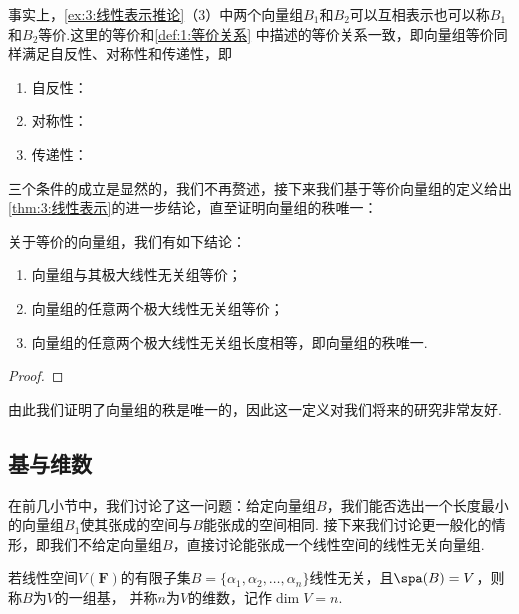 事实上，\autoref{ex:3:线性表示推论}（3）中两个向量组$B_1$和$B_2$可以互相表示也可以称$B_1$和$B_2$等价.这里的等价和\autoref{def:1:等价关系}
中描述的等价关系一致，即向量组等价同样满足自反性、对称性和传递性，即
\begin{enumerate}
    \item 自反性：
    \item 对称性：
    \item 传递性：
\end{enumerate}
三个条件的成立是显然的，我们不再赘述，接下来我们基于等价向量组的定义给出\autoref{thm:3:线性表示}的进一步结论，直至证明向量组的秩唯一：
\begin{corollary}
    关于等价的向量组，我们有如下结论：
    \begin{enumerate}
        \item 向量组与其极大线性无关组等价；
        \item 向量组的任意两个极大线性无关组等价；
        \item 向量组的任意两个极大线性无关组长度相等，即向量组的秩唯一.
    \end{enumerate}
\end{corollary}
\begin{proof}
    
\end{proof}

由此我们证明了向量组的秩是唯一的，因此这一定义对我们将来的研究非常友好.
\subsection{基与维数}
在前几小节中，我们讨论了这一问题：给定向量组$B$，我们能否选出一个长度最小的向量组$B_1$使其张成的空间与$B$能张成的空间相同.
接下来我们讨论更一般化的情形，即我们不给定向量组$B$，直接讨论能张成一个线性空间的线性无关向量组.
\begin{definition}
    若线性空间$V(\mathbf{F})$的有限子集$B=\{\alpha_1,\alpha_2,\ldots,\alpha_n\}$线性无关，且$\spa(B) = V$，则称$B$为$V$的一组基，
    并称$n$为$V$的维数，记作$\dim V = n$.
\end{definition}

